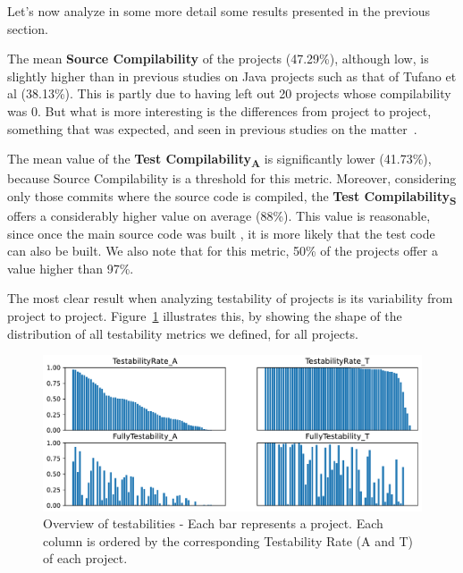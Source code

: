 Let's now analyze in some more detail some  results presented in the previous section.

The mean \textbf{Source Compilability} of the projects (47.29\%), although low, is slightly higher than in previous studies on Java projects such as that of Tufano et al (38.13\%). 
This is partly due to having left out 20 projects whose compilability was 0.
But what is more interesting is the differences from project to project, something that was expected, and seen in previous studies on the matter~\cite{tufano2017there,sulir2020large,querel:2021:warning}.

The mean value of the \textbf{Test Compilability\textsubscript{A}} is significantly lower (41.73\%), because Source Compilability is a threshold for this metric.
Moreover, considering only those commits where the source code is compiled, the \textbf{Test Compilability\textsubscript{S}} offers a considerably higher value on average (88\%).
This value is reasonable, since once the main source code was built , it is more likely that the test code can also be built. 
We also note that for this metric, 50\% of the projects offer a value higher than 97\%.



The most clear result when analyzing testability of projects is its variability from project to project. 
Figure~\ref{fig:testability-overview} illustrates this, by showing the shape of the distribution of all testability metrics we defined, for all projects.

\begin{figure}[ht!]
    \centering    
    \includegraphics[width=\textwidth]{pages/02-Testability/images/Overview.pdf}
    \caption{Overview of testabilities - Each bar represents a project. Each column is ordered by the corresponding Testability Rate (A and T) of each project.}
    \label{fig:testability-overview}
\end{figure}

